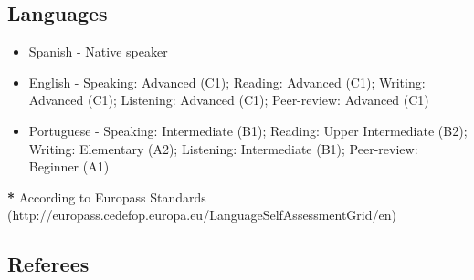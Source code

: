 \documentclass[letterpaper,11pt]{article}
\begin{document}
\subsection*{Languages}
\begin{itemize}
    \item Spanish - Native speaker
    \item English -
    Speaking: Advanced (C1); Reading: Advanced (C1); 
   Writing: Advanced (C1); Listening: Advanced (C1);
    Peer-review: Advanced (C1)
    \item Portuguese - 
    Speaking: Intermediate (B1); Reading: Upper Intermediate (B2);
    Writing: Elementary (A2); Listening: Intermediate (B1);
    Peer-review: Beginner (A1)

\end{itemize}   
\hspace{0.4cm}\textbf{*} According to Europass Standards \small{(http://europass.cedefop.europa.eu/LanguageSelfAssessmentGrid/en)}
\subsection*{Referees}
\end{document}

